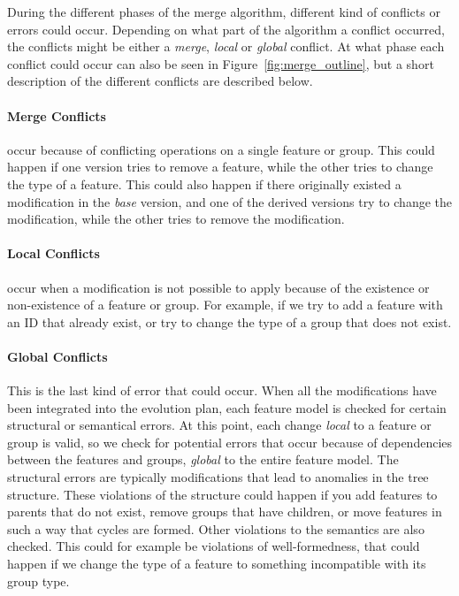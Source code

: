 \documentclass[a4paper,english]{ifimaster}
\begin{document}
During the different phases of the merge algorithm, different kind of conflicts or errors could occur. Depending on what part of the algorithm a conflict occurred, the conflicts might be either a \textit{merge}, \textit{local} or \textit{global} conflict. At what phase each conflict could occur can also be seen in Figure~\vref{fig:merge_outline}, but a short description of the different conflicts are described below. 

\paragraph{Merge Conflicts}%
\label{par:merge_conflicts}

occur because of conflicting operations on a single feature or group. This could happen if one version tries to remove a feature, while the other tries to change the type of a feature. This could also happen if there originally existed a modification in the \textit{base} version, and one of the derived versions try to change the modification, while the other tries to remove the modification.

\paragraph{Local Conflicts}%
\label{par:local_conflicts}

occur when a modification is not possible to apply because of the existence or non-existence of a feature or group. For example, if we try to add a feature with an ID that already exist, or try to change the type of a group that does not exist.

\paragraph{Global Conflicts}%
\label{par:global_conflicts}

This is the last kind of error that could occur. When all the modifications have been integrated into the evolution plan, each feature model is checked for certain structural or semantical errors. At this point, each change \textit{local} to a feature or group is valid, so we check for potential errors that occur because of dependencies between the features and groups, \textit{global} to the entire feature model. The structural errors are typically modifications that lead to anomalies in the tree structure. These violations of the structure could happen if you add features to parents that do not exist, remove groups that have children, or move features in such a way that cycles are formed. Other violations to the semantics are also checked. This could for example be violations of well-formedness, that could happen if we change the type of a feature to something incompatible with its group type.
\end{document}

